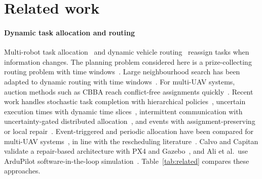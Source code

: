 \section{Related work}\label{sec:related}
\paragraph{Dynamic task allocation and routing} Multi-robot task allocation~\cite{gerkey2004formal} and dynamic vehicle
routing~\cite{pillac2013review,psaraftis2016dynamic} reassign tasks when information changes. The
planning problem considered here is a prize-collecting routing problem with time
windows~\cite{solomon1987algorithms,vansteenwegen2011orienteering}. Large neighbourhood search has been adapted to dynamic routing with time windows~\cite{alnsdvrp2024}. For multi-UAV
systems, auction methods such as CBBA reach conflict-free assignments quickly~\cite{choi2009consensus}.
Recent work handles stochastic task completion with hierarchical policies~\cite{choudhury2022dynamic}, uncertain
execution times with dynamic time slices~\cite{huang2024dynamic}, intermittent communication with uncertainty-gated
distributed allocation~\cite{ucdg2026drones}, and events with assignment-preserving or local
repair~\cite{hwang2026apr,shen2026localrepair}. Event-triggered and periodic allocation have been compared for
multi-UAV systems~\cite{cong2026event}, in line with the rescheduling
literature~\cite{vieira2003rescheduling,ouelhadj2009survey}. Calvo and Capitan validate a repair-based architecture
with PX4 and Gazebo~\cite{calvo2025heterogeneous}, and Ali et al.\ use ArduPilot software-in-the-loop
simulation~\cite{ali2026sitl}. Table~\ref{tab:related} compares these approaches.


